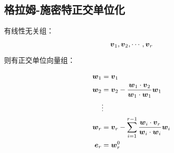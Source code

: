\documentclass{article}
\begin{document}
\subsection{格拉姆-施密特正交单位化}\label{Orthogonalization}

有线性无关组：

\[\boldsymbol v_1,\boldsymbol v_2,\cdots,\boldsymbol v_r\]

则有正交单位向量组：

\[\begin{aligned}
        \boldsymbol w_1  & =\boldsymbol v_1                                                         \\
        \boldsymbol w_2  & =\boldsymbol v_2-\frac{\boldsymbol w_1\cdot\boldsymbol v_2}{\boldsymbol w_1\cdot\boldsymbol w_1}\boldsymbol w_1                 \\
              & \vdots                                                        \\
        \boldsymbol w_r  & =\boldsymbol v_r-\sum_{i=1}^{r-1}\frac{\boldsymbol w_i\cdot\boldsymbol v_r}{\boldsymbol w_i\cdot\boldsymbol w_i}\boldsymbol w_i \\
        \boldsymbol e_r & =\boldsymbol w_r^0
    \end{aligned}\]
\end{document}
